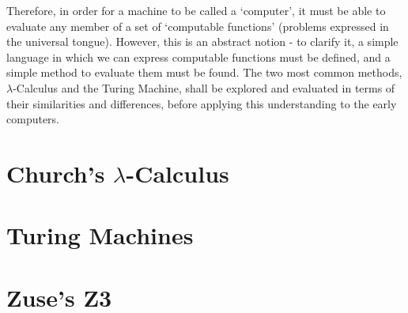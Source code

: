 \documentclass {article}
\begin{document}
Therefore, in order for a machine to be called a `computer', it must be able to evaluate any member of a set of `computable functions' (problems expressed in the universal tongue). However, this is an abstract notion - to clarify it, a simple language in which we can express computable functions must be defined, and a simple method to evaluate them must be found. The two most common methods, $\lambda$-Calculus and the Turing Machine, shall be explored and evaluated in terms of their similarities and differences, before applying this understanding to the early computers.



\section{Church's $\lambda$-Calculus}



\section{Turing Machines}



\section{Zuse's Z3}







\end{document}
